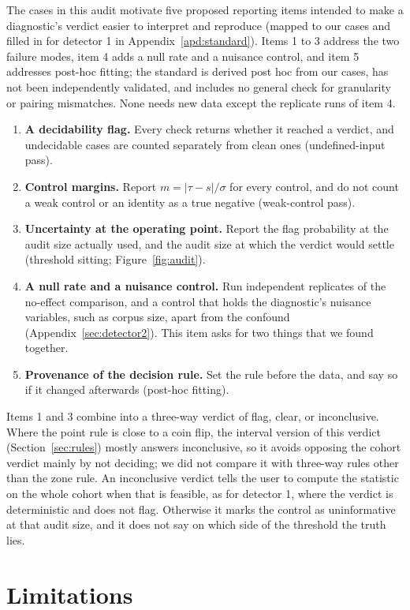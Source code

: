 \documentclass[10pt]{article}
\theoremstyle{definition}
\begin{document}
The cases in this audit motivate five proposed reporting items intended to make a diagnostic's verdict easier to interpret and reproduce (mapped to our cases and filled in for detector 1 in Appendix~\ref{apd:standard}). Items 1 to 3 address the two failure modes, item 4 adds a null rate and a nuisance control, and item 5 addresses post-hoc fitting; the standard is derived post hoc from our cases, has not been independently validated, and includes no general check for granularity or pairing mismatches. None needs new data except the replicate runs of item 4.
\begin{enumerate}
  \item \textbf{A decidability flag.} Every check returns whether it reached a verdict, and undecidable cases are counted separately from clean ones (undefined-input pass).
  \item \textbf{Control margins.} Report $m=|\tau-s|/\sigma$ for every control, and do not count a weak control or an identity as a true negative (weak-control pass).
  \item \textbf{Uncertainty at the operating point.} Report the flag probability at the audit size actually used, and the audit size at which the verdict would settle (threshold sitting; Figure~\ref{fig:audit}).
  \item \textbf{A null rate and a nuisance control.} Run independent replicates of the no-effect comparison, and a control that holds the diagnostic's nuisance variables, such as corpus size, apart from the confound (Appendix~\ref{sec:detector2}). This item asks for two things that we found together.
  \item \textbf{Provenance of the decision rule.} Set the rule before the data, and say so if it changed afterwards (post-hoc fitting).
\end{enumerate}
Items 1 and 3 combine into a three-way verdict of flag, clear, or inconclusive. Where the point rule is close to a coin flip, the interval version of this verdict (Section~\ref{sec:rules}) mostly answers inconclusive, so it avoids opposing the cohort verdict mainly by not deciding; we did not compare it with three-way rules other than the zone rule. An inconclusive verdict tells the user to compute the statistic on the whole cohort when that is feasible, as for detector 1, where the verdict is deterministic and does not flag. Otherwise it marks the control as uninformative at that audit size, and it does not say on which side of the threshold the truth lies.

\section{Limitations}
\label{sec:limits}
\end{document}
